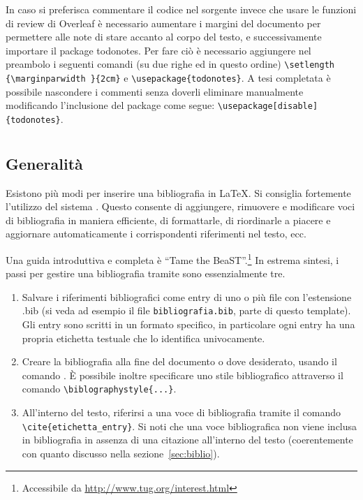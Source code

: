 \documentclass[12pt]{report}
\begin{document}
In caso si preferisca commentare il codice nel sorgente invece che usare le funzioni di review di Overleaf è necessario aumentare i margini del documento per permettere alle note di stare accanto al corpo del testo, e successivamente importare il package todonotes. Per fare ciò è necessario aggiungere nel preambolo i seguenti comandi (su due righe ed in questo ordine) \verb|\setlength {\marginparwidth }{2cm}| e \verb|\usepackage{todonotes}|. A tesi completata è possibile nascondere i commenti senza doverli eliminare manualmente modificando l'inclusione del package come segue: \verb|\usepackage[disable]{todonotes}|.


\section{}
\label{sec:bibtex}

\subsection{Generalit\`a}

Esistono più modi per inserire una bibliografia in \LaTeX. Si consiglia fortemente l'utilizzo del sistema . Questo consente di aggiungere, rimuovere e modificare voci di bibliografia in maniera efficiente, di formattarle, di riordinarle a piacere e aggiornare automaticamente i corrispondenti riferimenti nel testo, ecc.

Una guida introduttiva e completa \`e ``Tame the BeaST''.\footnote{Accessibile da \url{http://www.tug.org/interest.html}}
In estrema sintesi, i passi per gestire una bibliografia tramite  sono essenzialmente tre.
\begin{enumerate}
\item Salvare i riferimenti bibliografici come entry di uno o pi\`u file con l'estensione .bib (si veda ad esempio il file \texttt{bibliografia.bib}, parte di questo template). Gli entry sono scritti in un formato specifico, in particolare ogni entry ha una propria etichetta testuale che lo identifica univocamente.
\item Creare la bibliografia alla fine del documento o dove desiderato, usando il comando \verb||. \`E possibile inoltre specificare uno stile bibliografico attraverso il comando \verb|\biblographystyle{...}|.
\item All'interno del testo, riferirsi a una voce di bibliografia tramite il comando\\ \verb|\cite{etichetta_entry}|. Si noti che una voce bibliografica non viene inclusa in bibliografia in assenza di una citazione all'interno del testo (coerentemente con quanto discusso nella sezione~\ref{sec:biblio}).
\end{enumerate}
\end{document}
